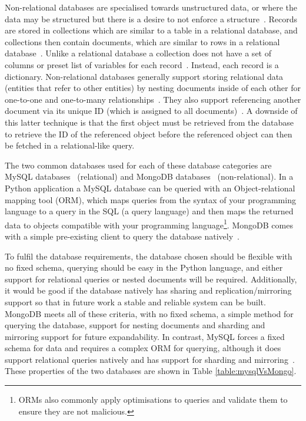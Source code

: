 \documentclass[authoryearcitations]{UoYCSproject}
\begin{document}
Non-relational databases are specialised towards unstructured data, or where the data may be structured but there is a desire to not enforce a structure~\cite{Parker:2013:CNM:2498328.2500047}. Records are stored in collections which are similar to a table in a relational database, and collections then contain documents, which are similar to rows in a relational database~\cite{Parker:2013:CNM:2498328.2500047}. Unlike a relational database a collection does not have a set of columns or preset list of variables for each record~\cite{Parker:2013:CNM:2498328.2500047}. Instead, each record is a dictionary. Non-relational databases generally support storing relational data (entities that refer to other entities) by nesting documents inside of each other for one-to-one and one-to-many relationships~\cite{Parker:2013:CNM:2498328.2500047}. They also support referencing another document via its unique ID (which is assigned to all documents)~\cite{Parker:2013:CNM:2498328.2500047}. A downside of this latter technique is that the first object must be retrieved from the database to retrieve the ID of the referenced object before the referenced object can then be fetched in a relational-like query.

The two common databases used for each of these database categories are MySQL databases~\cite{mySqlDb} (relational) and MongoDB databases~\cite{mongoDb} (non-relational). In a Python application a MySQL database can be queried with an Object-relational mapping tool (ORM), which maps queries from the syntax of your programming language to a query in the SQL (a query language) and then maps the returned data to objects compatible with your programming language\footnote{ORMs also commonly apply optimisations to queries and validate them to ensure they are not malicious.}. MongoDB comes with a simple pre-existing client to query the database natively~\cite{libraryPyMongo}.

To fulfil the database requirements, the database chosen should be flexible with no fixed schema, querying should be easy in the Python language, and either support for relational queries or nested documents will be required. Additionally, it would be good if the database natively has sharing and replication/mirroring support so that in future work a stable and reliable system can be built. MongoDB meets all of these criteria, with no fixed schema, a simple method for querying the database, support for nesting documents and sharding and mirroring support for future expandability. In contrast, MySQL forces a fixed schema for data and requires a complex ORM for querying, although it does support relational queries natively and has support for sharding and mirroring~\cite{mySqlShardingReplication}. These properties of the two databases are shown in Table \ref{table:mysqlVsMongo}.
\end{document}
